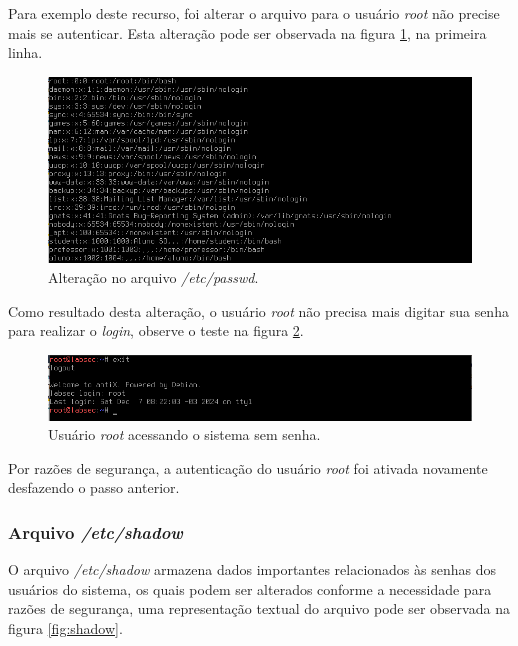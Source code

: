 \documentclass[
	12pt,				%
	oneside,   	        %
	a4paper,			%
	english,			%
	french,				%
	spanish,			%
	brazil,				%
	]{pacotes/abntex2}
\begin{document}
Para exemplo deste recurso, foi alterar o arquivo para o usuário \textit{root} não precise mais se autenticar. Esta alteração pode ser observada na figura \ref{fig:passwd_root}, na primeira linha.
\begin{figure}[H]
  \centering
  \includegraphics[scale=0.7]{figuras/passwd_root.png}
  \caption{Alteração no arquivo \textit{/etc/passwd}.}
  \label{fig:passwd_root}
\end{figure}

Como resultado desta alteração, o usuário \textit{root} não precisa mais digitar sua senha para realizar o \textit{login}, observe o teste na figura \ref{fig:login_sem_senha}.

\begin{figure}[H]
  \centering
  \includegraphics[scale=0.7]{figuras/login_sem_senha.png}
  \caption{Usuário \textit{root} acessando o sistema sem senha.}
  \label{fig:login_sem_senha}
\end{figure}

Por razões de segurança, a autenticação do usuário \textit{root} foi ativada novamente desfazendo o passo anterior.

\subsubsection{Arquivo \textit{/etc/shadow}}
O arquivo \textit{/etc/shadow} armazena dados importantes relacionados às senhas dos usuários do sistema, os quais podem ser alterados conforme a necessidade para razões de segurança, uma representação textual do arquivo pode ser observada na figura \ref{fig:shadow}. 
\end{document}
